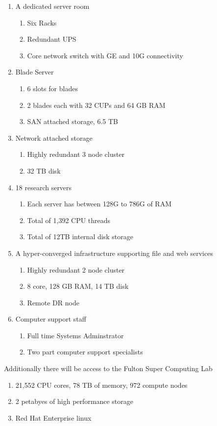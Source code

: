 \documentclass[11pt]{article}
\begin{document}
\begin{enumerate}
\itemsep-0.1em 

\item A dedicated server room
\begin{enumerate}
\itemsep-0.1em 
\item Six Racks
\item Redundant UPS
\item Core network switch with GE and 10G connectivity
\end{enumerate}

\item Blade Server
\begin{enumerate}
\itemsep-0.1em 
\item 6 slots for blades
\item 2 blades each with 32 CUPs and 64 GB RAM
\item SAN attached storage, 6.5 TB
\end{enumerate}

\item Network attached storage
\begin{enumerate}
\itemsep-0.1em 
\item Highly redundant 3 node cluster
\item 32 TB disk
\end{enumerate}

\item 18 research servers
\begin{enumerate}
\itemsep-0.1em 
\item Each server has between 128G to 786G of RAM
\item Total of 1,392 CPU threads
\item Total of 12TB internal disk storage
\end{enumerate}

\item A hyper-converged infrastructure supporting file and web services
\begin{enumerate}
\itemsep-0.1em 
\item Highly redundant 2 node cluster
\item 8 core, 128 GB RAM, 14 TB disk
\item Remote DR node
\end{enumerate}

\item Computer support staff
\begin{enumerate}
\itemsep-0.1em 
\item Full time Systems Adminstrator
\item Two part computer support specialists
\end{enumerate}

\end{enumerate} 

\noindent Additionally there will be access to the Fulton Super Computing Lab
\begin{enumerate}
\itemsep-0.1em 
\item 21,552 CPU cores, 78 TB of memory, 972 compute nodes
\item 2 petabyes of high performance storage
\item Red Hat Enterprise linux
\end{enumerate}
\end{document}
